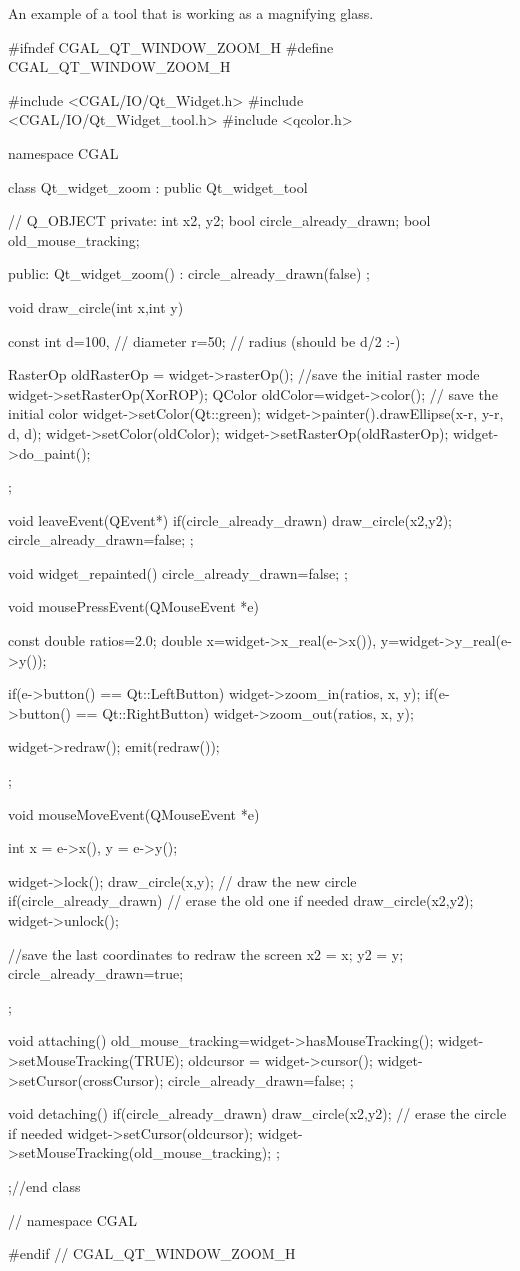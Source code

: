 \ccExample
An example of a tool that is working as a magnifying glass.
\begin{ccExampleCode}
#ifndef CGAL_QT_WINDOW_ZOOM_H
#define CGAL_QT_WINDOW_ZOOM_H

#include <CGAL/IO/Qt_Widget.h>
#include <CGAL/IO/Qt_Widget_tool.h>
#include <qcolor.h>

namespace CGAL {

class Qt_widget_zoom : public Qt_widget_tool
{
  //  Q_OBJECT
private:
	int									    x2, y2;
	bool circle_already_drawn;
	bool old_mouse_tracking;

public:
  Qt_widget_zoom() : circle_already_drawn(false) {};

  void draw_circle(int x,int y)
  {
    const int
    d=100, // diameter
    r=50;  // radius (should be d/2 :-)

    RasterOp oldRasterOp = widget->rasterOp();	//save the initial raster mode
    widget->setRasterOp(XorROP);
    QColor oldColor=widget->color(); // save the initial color
    widget->setColor(Qt::green);
    widget->painter().drawEllipse(x-r, y-r, d, d);
    widget->setColor(oldColor);
    widget->setRasterOp(oldRasterOp);
    widget->do_paint();
  };

  void leaveEvent(QEvent*)
  {
    if(circle_already_drawn)
      draw_circle(x2,y2);
    circle_already_drawn=false;
  };

  void widget_repainted(){
    circle_already_drawn=false;
  };

  void mousePressEvent(QMouseEvent *e)
  {
    const double ratios=2.0;
    double
      x=widget->x_real(e->x()),
      y=widget->y_real(e->y());
		
    if(e->button() == Qt::LeftButton)
      widget->zoom_in(ratios, x, y);
    if(e->button() == Qt::RightButton)
      widget->zoom_out(ratios, x, y);
		
    widget->redraw();
    emit(redraw()); 
  };

  void mouseMoveEvent(QMouseEvent *e)
  {
    int
      x = e->x(),
      y = e->y();

    widget->lock();
    draw_circle(x,y); // draw the new circle
    if(circle_already_drawn) // erase the old one if needed
        draw_circle(x2,y2);
    widget->unlock();
		
    //save the last coordinates to redraw the screen
    x2 = x;
    y2 = y;
    circle_already_drawn=true;
  };

  void attaching()
  {
    old_mouse_tracking=widget->hasMouseTracking();
    widget->setMouseTracking(TRUE);
    oldcursor = widget->cursor();
    widget->setCursor(crossCursor);
    circle_already_drawn=false;
  };

  void detaching()
  {
    if(circle_already_drawn)
      draw_circle(x2,y2); // erase the circle if needed
    widget->setCursor(oldcursor);
    widget->setMouseTracking(old_mouse_tracking);
  };
};//end class 

} // namespace CGAL

#endif // CGAL_QT_WINDOW_ZOOM_H
\end{ccExampleCode}








